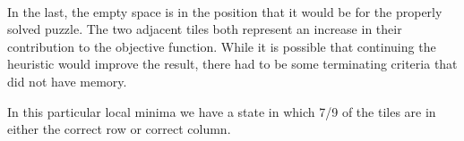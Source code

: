 \documentclass[12pt,letterpaper]{exam}
\begin{document}
\begin{questions}
\begin{parts}
\begin{solution}
\begin{minipage}{0.2\linewidth}
			\end{minipage}
			\begin{minipage}{0.2\linewidth}	
				\begin{tikzpicture}
				\end{tikzpicture}
			\end{minipage}
			\\
			
			In the last, the empty space is in the position that it would be for the properly solved puzzle.
			The two adjacent tiles both represent an increase in their contribution to the objective function.
			While it is possible that continuing the heuristic would improve the result,
			there had to be some terminating criteria that did not have memory.
			
			In this particular local minima we have a state in which 7/9 of the tiles are in 
			either the correct row or correct column. 
			
		\end{solution}
		

\end{parts}
\end{questions}
\end{document}
